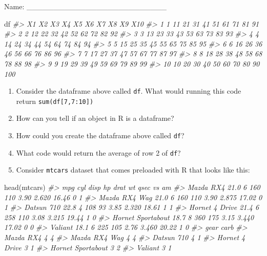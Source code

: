 \documentclass[
]{book}
\newenvironment{Shaded}{\begin{snugshade}}{\end{snugshade}}
\newcommand{\CommentTok}[1]{\textcolor[rgb]{0.56,0.35,0.01}{\textit{#1}}}
\newcommand{\FunctionTok}[1]{\textcolor[rgb]{0.00,0.00,0.00}{#1}}
\newcommand{\NormalTok}[1]{#1}
\begin{document}
Name: \_\_\_\_\_\_\_\_\_\_\_\_\_\_\_\_\_\_\_\_\_\_\_\_\_\_

\begin{Shaded}
\begin{Highlighting}[]
\NormalTok{df}
\CommentTok{\#\textgreater{}    X1 X2 X3 X4 X5 X6 X7 X8 X9 X10}
\CommentTok{\#\textgreater{} 1   1 11 21 31 41 51 61 71 81  91}
\CommentTok{\#\textgreater{} 2   2 12 22 32 42 52 62 72 82  92}
\CommentTok{\#\textgreater{} 3   3 13 23 33 43 53 63 73 83  93}
\CommentTok{\#\textgreater{} 4   4 14 24 34 44 54 64 74 84  94}
\CommentTok{\#\textgreater{} 5   5 15 25 35 45 55 65 75 85  95}
\CommentTok{\#\textgreater{} 6   6 16 26 36 46 56 66 76 86  96}
\CommentTok{\#\textgreater{} 7   7 17 27 37 47 57 67 77 87  97}
\CommentTok{\#\textgreater{} 8   8 18 28 38 48 58 68 78 88  98}
\CommentTok{\#\textgreater{} 9   9 19 29 39 49 59 69 79 89  99}
\CommentTok{\#\textgreater{} 10 10 20 30 40 50 60 70 80 90 100}
\end{Highlighting}
\end{Shaded}

\begin{enumerate}
\def\labelenumi{\arabic{enumi}.}
\item
  Consider the dataframe above called \texttt{df}. What would running this code return \texttt{sum(df{[}7,7:10{]})}
\item
  How can you tell if an object in R is a dataframe?
\item
  How could you create the dataframe above called \texttt{df}?
\item
  What code would return the average of row 2 of \texttt{df}?
\item
  Consider \texttt{mtcars} dataset that comes preloaded with R that looks like this:
\end{enumerate}

\begin{Shaded}
\begin{Highlighting}[]
\FunctionTok{head}\NormalTok{(mtcars)}
\CommentTok{\#\textgreater{}                    mpg cyl disp  hp drat    wt  qsec vs am}
\CommentTok{\#\textgreater{} Mazda RX4         21.0   6  160 110 3.90 2.620 16.46  0  1}
\CommentTok{\#\textgreater{} Mazda RX4 Wag     21.0   6  160 110 3.90 2.875 17.02  0  1}
\CommentTok{\#\textgreater{} Datsun 710        22.8   4  108  93 3.85 2.320 18.61  1  1}
\CommentTok{\#\textgreater{} Hornet 4 Drive    21.4   6  258 110 3.08 3.215 19.44  1  0}
\CommentTok{\#\textgreater{} Hornet Sportabout 18.7   8  360 175 3.15 3.440 17.02  0  0}
\CommentTok{\#\textgreater{} Valiant           18.1   6  225 105 2.76 3.460 20.22  1  0}
\CommentTok{\#\textgreater{}                   gear carb}
\CommentTok{\#\textgreater{} Mazda RX4            4    4}
\CommentTok{\#\textgreater{} Mazda RX4 Wag        4    4}
\CommentTok{\#\textgreater{} Datsun 710           4    1}
\CommentTok{\#\textgreater{} Hornet 4 Drive       3    1}
\CommentTok{\#\textgreater{} Hornet Sportabout    3    2}
\CommentTok{\#\textgreater{} Valiant              3    1}
\end{Highlighting}
\end{Shaded}
\end{document}

